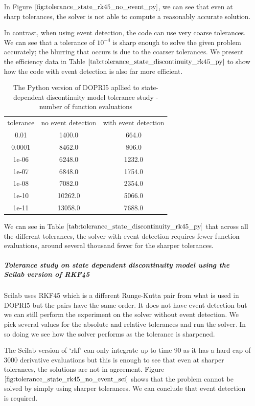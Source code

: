 In Figure $\ref{fig:tolerance_state_rk45_no_event_py}$, we can see that even at sharp tolerances, the solver is not able to compute a reasonably accurate solution.

In contrast, when using event detection, the code can use very coarse tolerances. We can see that a tolerance of $10^{-4}$ is sharp enough to solve the given problem accurately; the blurring that occurs is due to the coarser tolerances. We present the efficiency data in Table $\ref{tab:tolerance_state_discontinuity_rk45_py}$ to show how the code with event detection is also far more efficient.

\begin{table}[h]
\caption {The Python version of DOPRI5 apllied to state-dependent discontinuity model tolerance study - number of function evaluations} \label{tab:tolerance_state_discontinuity_rk45_py} 
\begin{center}
\begin{tabular}{ c c c }
tolerance & no event detection & with event detection \\
0.01 & 1400.0 & 664.0 \\
0.0001 & 8462.0 & 806.0 \\
1e-06 & 6248.0 & 1232.0 \\
1e-07 & 6848.0 & 1754.0 \\
1e-08 & 7082.0 & 2354.0 \\
1e-10 & 10262.0 & 5066.0 \\
1e-11 & 13058.0 & 7688.0 \\
\end{tabular}
\end{center}
\end{table}

We can see in Table $\ref{tab:tolerance_state_discontinuity_rk45_py}$ that across all the different tolerances, the solver with event detection requires fewer function evaluations, around several thousand fewer for the sharper tolerances. 

\subparagraph{Tolerance study on state dependent discontinuity model using the Scilab version of RKF45}
Scilab uses RKF45 which is a different Runge-Kutta pair from what is used in DOPRI5 but the pairs have the same order. It does not have event detection but we can still perform the experiment on the solver without event detection. We pick several values for the absolute and relative tolerances and run the solver. In so doing we see how the solver performs as the tolerance is sharpened. 

The Scilab version of `rkf' can only integrate up to time 90 as it has a hard cap of 3000 derivative evaluations but this is enough to see that even at sharper tolerances, the solutions are not in agreement. Figure $\ref{fig:tolerance_state_rk45_no_event_sci}$ shows that the problem cannot be solved by simply using sharper tolerances. We can conclude that event detection is required. 

